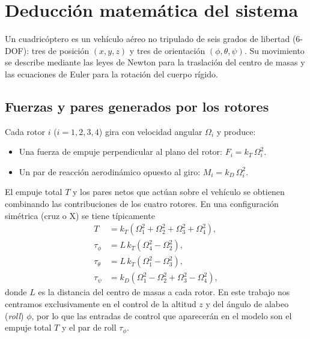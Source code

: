 \documentclass{uofa-eng-assignment}
\begin{document}

\section{Deducción matemática del sistema}

Un cuadricóptero es un vehículo aéreo no tripulado de seis grados de libertad (6-DOF): tres de posición $(x,y,z)$ y tres de orientación $(\phi,\theta,\psi)$. Su movimiento se describe mediante las leyes de Newton para la traslación del centro de masas y las ecuaciones de Euler para la rotación del cuerpo rígido.

\subsection{Fuerzas y pares generados por los rotores}

Cada rotor $i$ ($i=1,2,3,4$) gira con velocidad angular $\Omega_i$ y produce:
\begin{itemize}
    \item Una fuerza de empuje perpendicular al plano del rotor: $F_i = k_T\,\Omega_i^2$.
    \item Un par de reacción aerodinámico opuesto al giro: $M_i = k_D\,\Omega_i^2$.
\end{itemize}

El empuje total $T$ y los pares netos que actúan sobre el vehículo se obtienen combinando las contribuciones de los cuatro rotores. En una configuración simétrica (cruz o X) se tiene típicamente
\begin{align}
    T      &= k_T(\Omega_1^2+\Omega_2^2+\Omega_3^2+\Omega_4^2), \label{eq:empuje}\\
    \tau_\phi &= L\,k_T(\Omega_4^2-\Omega_2^2), \label{eq:roll}\\
    \tau_\theta &= L\,k_T(\Omega_1^2-\Omega_3^2), \label{eq:pitch}\\
    \tau_\psi   &= k_D(\Omega_1^2-\Omega_2^2+\Omega_3^2-\Omega_4^2), \label{eq:yaw}
\end{align}
donde $L$ es la distancia del centro de masas a cada rotor. En este trabajo nos centramos exclusivamente en el control de la altitud $z$ y del ángulo de alabeo (\textit{roll}) $\phi$, por lo que las entradas de control que aparecerán en el modelo son el empuje total $T$ y el par de roll $\tau_\phi$.
\end{document}
